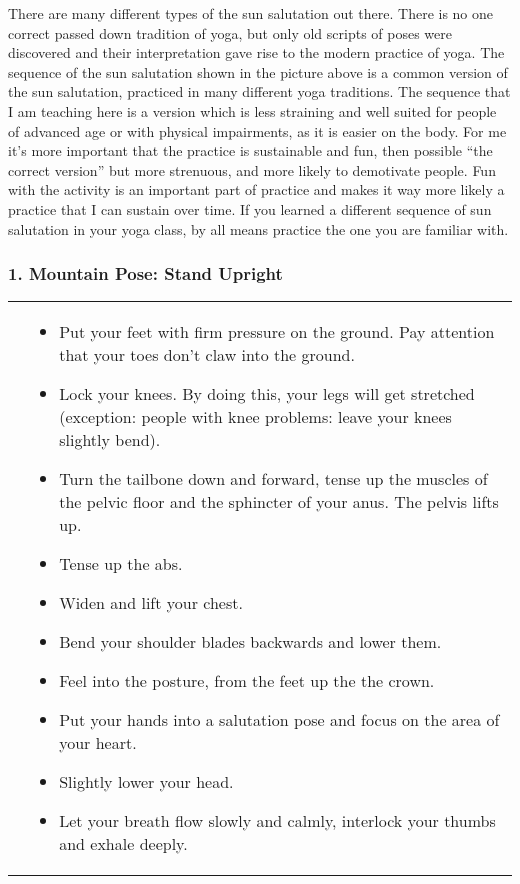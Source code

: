 \documentclass[../Book.Stress_regulation.tex]{subfiles}
\begin{document}
There are many different types of the sun salutation out there.
There is no one correct passed down tradition of yoga, but only old scripts of poses were discovered and their interpretation gave rise to the modern practice of yoga.
The sequence of the sun salutation shown in the picture above is a common version of the sun salutation, practiced in many different yoga traditions.
The sequence that I am teaching here is a version which is less straining and well suited for people of advanced age or with physical impairments, as it is easier on the body\cite{VidyaYoga}.
For me it's more important that the practice is sustainable and fun, then possible ``the correct version'' but more strenuous, and more likely to demotivate people.
Fun with the activity is an important part of practice and makes it way more likely a practice that I can sustain over time.
If you learned a different sequence of sun salutation in your yoga class, by all means  practice the one you are familiar with.

\newpage

\subsubsection{1. Mountain Pose: Stand Upright}

\begin{tabular}{p{1.4cm} p{10.1cm}}
  \raisebox{-1.1\totalheight}{\texttt{[image: SS\_Mountain]}} &                                                                     
\begin{itemize}
\item Put your feet with firm pressure on the ground. Pay attention that your toes don't claw into the ground.
\item Lock your knees. By doing this, your legs will get stretched (exception: people with knee problems: leave your knees slightly bend).
\item Turn the tailbone down and forward, tense up the muscles of the pelvic floor and the sphincter of your anus. The pelvis lifts up.
\item Tense up the abs.
\item Widen and lift your chest.
\item Bend your shoulder blades backwards and lower them.
\item Feel into the posture, from the feet up the the crown.
\item Put your hands into a salutation pose and focus on the area of your heart.
\item Slightly lower your head.
\item Let your breath flow slowly and calmly, interlock your thumbs and exhale deeply.
\end{itemize}
  
\end{tabular}
\end{document}
